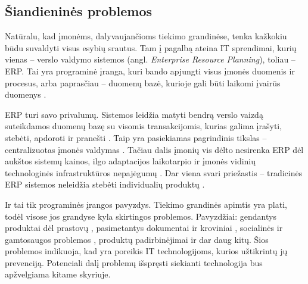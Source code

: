 
\subsection{Šiandieninės problemos}

Natūralu, kad įmonėms, dalyvaujančioms tiekimo grandinėse, tenka kažkokiu būdu suvaldyti visus esybių srautus. Tam į pagalbą ateina IT sprendimai, kurių vienas – verslo valdymo sistemos (angl. \textit{Enterprise Resource Planning}), toliau – ERP. Tai yra programinė įranga, kuri bando apjungti visus įmonės duomenis ir procesus, arba paprasčiau – duomenų bazė, kurioje gali būti laikomi įvairūs duomenys \cite{ozcan2016software}. 

ERP turi savo privalumų. Sistemos leidžia matyti bendrą verslo vaizdą suteikdamos duomenų bazę su visomis transakcijomis, kurias galima įrašyti, stebėti, apdoroti ir pranešti \cite{neubert2018collaboration}. Taip yra pasiekiamas pagrindinis tikslas – centralizuotas įmonės valdymas \cite{ozcan2016software}. Tačiau dalis įmonių vis dėlto nesirenka ERP dėl aukštos sistemų kainos, ilgo adaptacijos laikotarpio ir įmonės vidinių technologinės infrastruktūros nepajėgumų \cite{ozcan2016software}. Dar viena svari priežastis – tradicinės ERP sistemos neleidžia stebėti individualių produktų \cite{garg2018supply}. 

Ir tai tik programinės įrangos pavyzdys. Tiekimo grandinės apimtis yra plati, todėl visose jos grandyse kyla skirtingos problemos. Pavyzdžiai: gendantys produktai dėl prastovų \cite{briano2010resiliency}, pasimetantys dokumentai ir kroviniai \cite{huber2007vendor}, socialinės ir gamtosaugos problemos \cite{mani2015supply, vachon2006extending}, produktų padirbinėjimai \cite{huber2007vendor} ir dar daug kitų. Šios problemos indikuoja, kad yra poreikis IT technologijoms, kurios užtikrintų jų prevenciją. Potenciali dalį problemų išspręsti siekianti technologija bus apžvelgiama kitame skyriuje.